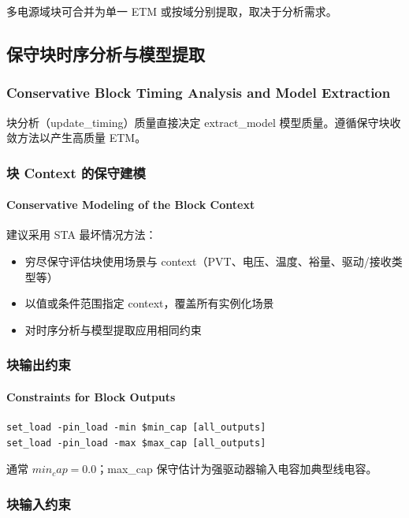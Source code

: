多电源域块可合并为单一 ETM 或按域分别提取，取决于分析需求。

\subsection{保守块时序分析与模型提取}
\subsubsection*{Conservative Block Timing Analysis and Model Extraction}

块分析（update_timing）质量直接决定 extract_model 模型质量。遵循保守块收敛方法以产生高质量 ETM。

\subsubsection{块 Context 的保守建模}
\paragraph*{Conservative Modeling of the Block Context}

建议采用 STA 最坏情况方法：
\begin{itemize}
  \item 穷尽保守评估块使用场景与 context（PVT、电压、温度、裕量、驱动/接收类型等）
  \item 以值或条件范围指定 context，覆盖所有实例化场景
  \item 对时序分析与模型提取应用相同约束
\end{itemize}

\subsubsection{块输出约束}
\paragraph*{Constraints for Block Outputs}

\begin{lstlisting}
set_load -pin_load -min $min_cap [all_outputs]
set_load -pin_load -max $max_cap [all_outputs]
\end{lstlisting}

通常 $min_cap=0.0；$max_cap 保守估计为强驱动器输入电容加典型线电容。

\subsubsection{块输入约束}
